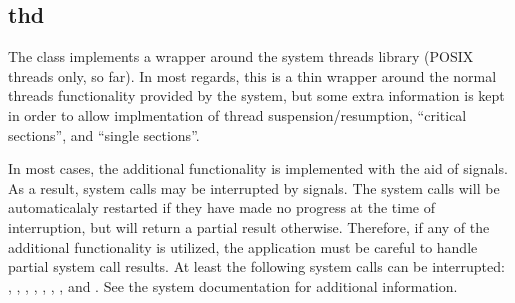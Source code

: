 %
%
%
%
%              

\subsection{thd}
\label{thd}

The  class implements a wrapper around the system threads library
(POSIX threads only, so far).  In most regards, this is a thin wrapper around
the normal threads functionality provided by the system, but some extra
information is kept in order to allow implmentation of thread
suspension/resumption, ``critical sections'', and ``single sections''.

In most cases, the additional functionality is implemented with the aid of
signals.  As a result, system calls may be interrupted by signals.  The system
calls will be automaticalaly restarted if they have made no progress at the time
of interruption, but will return a partial result otherwise.  Therefore, if any
of the additional functionality is utilized, the application must be careful to
handle partial system call results.  At least the following system calls can be
interrupted: , , ,
, , , , and
.  See the system documentation for additional information.

